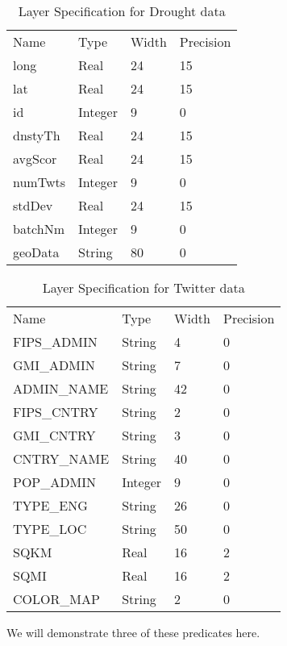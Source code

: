 \documentclass[conference]{IEEEtran}
\begin{document}
\begin{table}[]
\caption{Layer Specification for Drought data}
\label{Table 1}
\centering
\begin{tabular}{llll}
Name    & Type    & Width & Precision \\
long    & Real    & 24    & 15        \\
lat     & Real    & 24    & 15        \\
id      & Integer & 9     & 0         \\
dnstyTh & Real    & 24    & 15        \\
avgScor & Real    & 24    & 15        \\
numTwts & Integer & 9     & 0         \\
stdDev  & Real    & 24    & 15        \\
batchNm & Integer & 9     & 0         \\
geoData & String  & 80    & 0        
\end{tabular}
\end{table}

\begin{table}[]
\caption{Layer Specification for Twitter data}
\label{Table 2}
\centering
\begin{tabular}{llll}
Name        & Type    & Width & Precision \\
FIPS\_ADMIN & String  & 4     & 0         \\
GMI\_ADMIN  & String  & 7     & 0         \\
ADMIN\_NAME & String  & 42    & 0         \\
FIPS\_CNTRY & String  & 2     & 0         \\
GMI\_CNTRY  & String  & 3     & 0         \\
CNTRY\_NAME & String  & 40    & 0         \\
POP\_ADMIN  & Integer & 9     & 0         \\
TYPE\_ENG   & String  & 26    & 0         \\
TYPE\_LOC   & String  & 50    & 0         \\
SQKM        & Real    & 16    & 2         \\
SQMI        & Real    & 16    & 2         \\
COLOR\_MAP  & String  & 2     & 0        
\end{tabular}
\end{table}

We will demonstrate three of these predicates here.
\end{document}
